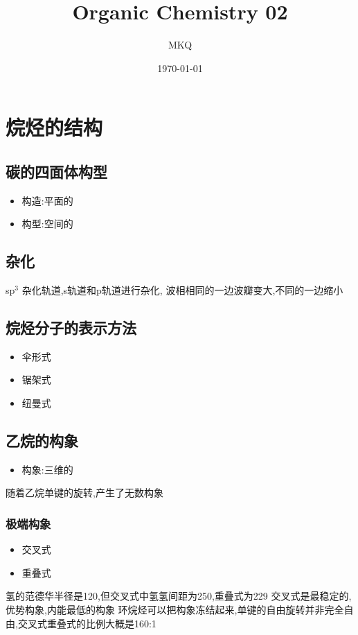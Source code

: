 \documentclass[11pt]{article}
\author{MKQ}
\date{\today}
\title{Organic Chemistry 02}
\begin{document}
\maketitle
\tableofcontents

\section{烷烃的结构}
\label{sec:orgd243e42}
\subsection{碳的四面体构型}
\label{sec:org61bdd25}
\begin{itemize}
\item 构造:平面的
\item 构型:空间的
\end{itemize}
\subsection{杂化}
\label{sec:org4743c32}
sp\(^{\text{3}}\) 杂化轨道,s轨道和p轨道进行杂化,
波相相同的一边波瓣变大,不同的一边缩小
\subsection{烷烃分子的表示方法}
\label{sec:org82c5efb}
\begin{itemize}
\item 伞形式
\item 锯架式
\item 纽曼式
\end{itemize}
\subsection{乙烷的构象}
\label{sec:org770680a}
\begin{itemize}
\item 构象:三维的
\end{itemize}
随着乙烷单键的旋转,产生了无数构象
\subsubsection{极端构象}
\label{sec:orge44588f}
\begin{itemize}
\item 交叉式
\item 重叠式
\end{itemize}
氢的范德华半径是120,但交叉式中氢氢间距为250,重叠式为229
交叉式是最稳定的,优势构象,内能最低的构象
环烷烃可以把构象冻结起来,单键的自由旋转并非完全自由,交叉式重叠式的比例大概是160:1
\end{document}
